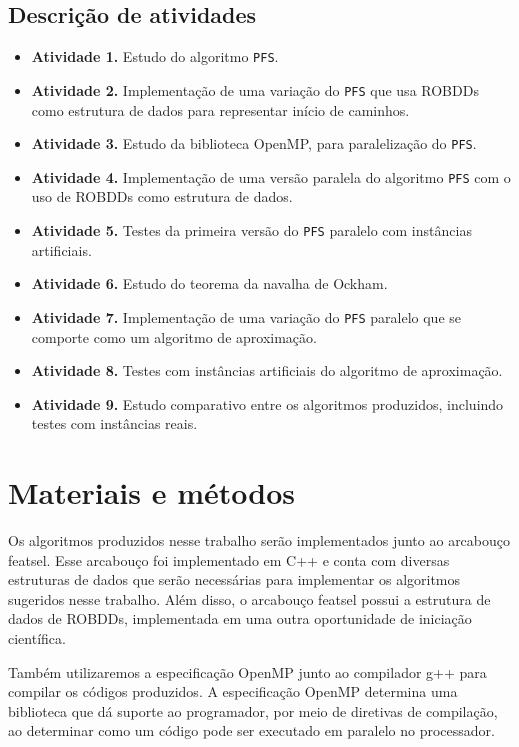 \documentclass[12pt]{article}
\begin{document}
\subsection{Descrição de atividades}
\begin{itemize}
    \item{\bf Atividade 1.}
        Estudo do algoritmo {\tt PFS}.
    \item{\bf Atividade 2.}
        Implementação de uma variação do {\tt PFS} que usa ROBDDs como 
        estrutura de dados para representar início de caminhos.
    \item{\bf Atividade 3.}
        Estudo da biblioteca OpenMP, para paralelização do {\tt PFS}.
    \item{\bf Atividade 4.}
        Implementação de uma versão paralela do algoritmo {\tt PFS} com
        o uso de ROBDDs como estrutura de dados.
    \item{\bf Atividade 5.}
        Testes da primeira versão do {\tt PFS} paralelo com instâncias
        artificiais.
    \item{\bf Atividade 6.}
        Estudo do teorema da navalha de Ockham.
    \item{\bf Atividade 7.} 
        Implementação de uma variação do {\tt PFS} paralelo que se 
        comporte como um algoritmo de aproximação.
    \item{\bf Atividade 8.}
        Testes com instâncias artificiais do algoritmo de aproximação.
    \item{\bf Atividade 9.}
        Estudo comparativo entre os algoritmos produzidos, incluindo
        testes com instâncias reais.
\end{itemize}


\section{Materiais e métodos}
Os algoritmos produzidos nesse trabalho serão implementados junto ao 
arcabouço featsel. Esse arcabouço foi implementado em C++ e conta com
diversas estruturas de dados que serão necessárias para implementar os
algoritmos sugeridos nesse trabalho. Além disso, o arcabouço featsel 
possui a estrutura de dados de ROBDDs, implementada em uma outra 
oportunidade de iniciação científica.

Também utilizaremos a especificação OpenMP junto ao compilador g++ para
compilar os códigos produzidos. A especificação OpenMP determina uma 
biblioteca que dá suporte ao programador, por meio de diretivas de 
compilação, ao determinar como um código pode ser executado em 
paralelo no processador.
\end{document}
